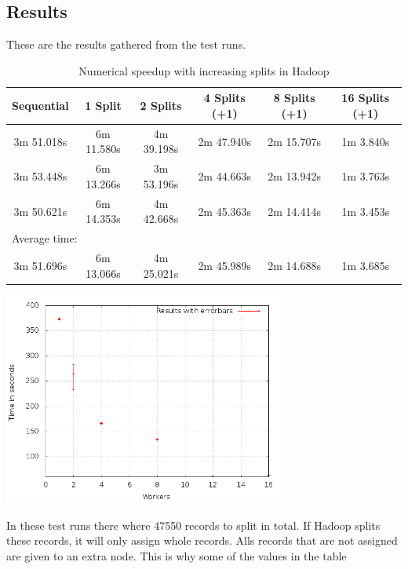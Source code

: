 \documentclass[a4paper]{article}
\begin{document}
  \subsection{Results}
    These are the results gathered from the test runs.
    \begin{table}[H]
	    \label{table:hadoop}
	    \caption{Numerical speedup with increasing splits in Hadoop}
	    \begin{center}
		    \begin{tabular}{| c | c | c | c | c | c |}
			    \hline
			    Sequential & 1 Split & 2 Splits & 4 Splits (+1) & 8 Splits (+1) & 16 Splits (+1)\\ 
			    \hline
			    3m 51.018s & 6m 11.580s & 4m 39.198s & 2m 47.940s & 2m 15.707s & 1m 3.840s\\
			    \hline
			    3m 53.448s & 6m 13.266s & 3m 53.196s & 2m 44.663s & 2m 13.942s & 1m 3.763s\\
			    \hline
			    3m 50.621s & 6m 14.353s & 4m 42.668s & 2m 45.363s & 2m 14.414s & 1m 3.453s\\
			    \hline
			    \multicolumn{6}{|l|}{Average time:}\\
			    \hline
			    3m 51.696s & 6m 13.066s & 4m 25.021s & 2m 45.989s & 2m 14.688s & 1m 3.685s\\
			    \hline
		    \end{tabular}
	    \end{center}
    \end{table}
    \begin{center}
      \includegraphics[width=0.7\textwidth]{speedplot.png}
    \end{center}
    In these test runs there where 47550 records to split in total.
    If Hadoop splits these records, it will only assign whole records.
    Alls records that are not assigned are given to an extra node. This is why some of the values in the table
\end{document}
